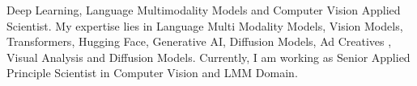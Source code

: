 \par{
	Deep  Learning, Language Multimodality Models and Computer Vision Applied  Scientist.
	My expertise lies in Language Multi Modality Models, Vision Models, Transformers, Hugging Face, Generative AI, Diffusion Models, Ad Creatives , Visual Analysis and Diffusion Models.
	 Currently, I am working as Senior Applied  Principle  Scientist in Computer Vision and LMM  Domain. 
}
